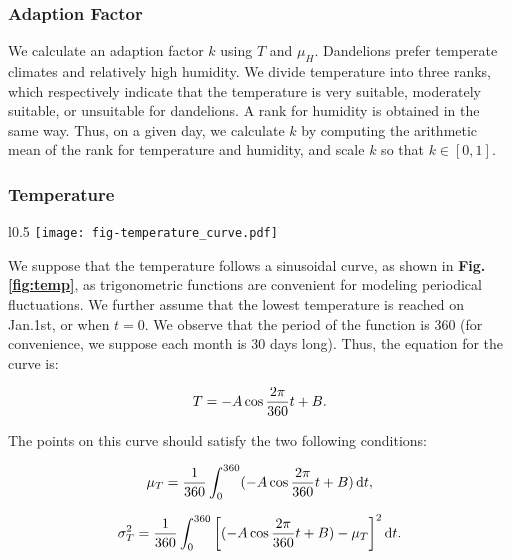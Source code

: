 \documentclass[12pt]{article}
\begin{document}
			
		
		\subsubsection{Adaption Factor}
		
			We calculate an adaption factor $k$ using $T$ and $\mu_H$.  Dandelions prefer temperate climates and relatively high humidity.  We divide temperature into three ranks, which respectively indicate that the temperature is very suitable, moderately suitable, or unsuitable for dandelions.  A rank for humidity is obtained in the same way.  Thus, on a given day, we calculate $k$ by computing the arithmetic mean of the rank for temperature and humidity, and scale $k$ so that $k \in [0, 1]$.
		
		\subsubsection{Temperature}
		
			\begin{wrapfigure}{l}{0.5\textwidth}
				\centering
				\texttt{[image: fig-temperature\_curve.pdf]}
				\caption{Temperature curve}
				\label{fig:temp}
			\end{wrapfigure}
			
			We suppose that the temperature follows a sinusoidal curve, as shown in \textbf{Fig.\ref{fig:temp}}, as trigonometric functions are convenient for modeling periodical fluctuations.  We further assume that the lowest temperature is reached on Jan.1st, or when $t = 0$.  We observe that the period of the function is 360 (for convenience, we suppose each month is 30 days long).  Thus, the equation for the curve is:
			
			\begin{equation}
				T = -A \cos{\frac{2\pi}{360} t} + B. \notag
			\end{equation}
			
			The points on this curve should satisfy the two following conditions:
			
			\begin{equation}
				\mu_T = \frac1{360} \int_0^{360} (-A \cos{\frac{2\pi}{360} t} + B) \, \mathrm{d}t, \notag
			\end{equation}
			
			\begin{equation}
				\sigma_T^2 = \frac1{360} \int_0^{360} \left[ (-A \cos{\frac{2\pi}{360} t} + B) - \mu_T \right] ^2 	\mathrm{d}t. \notag
			\end{equation}
			
\end{document}
